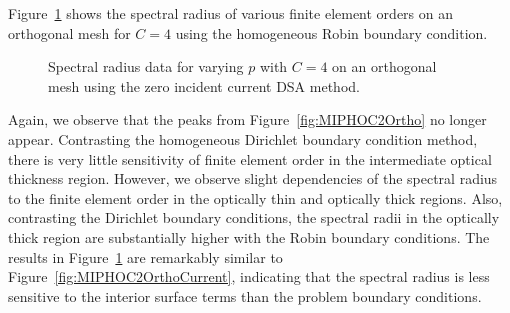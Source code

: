 \documentclass[12pt,letterpaper]{article}
\begin{document}
Figure~\ref{fig:MIPHOC4OrthoCurrent} shows the spectral radius of various finite element orders on an orthogonal mesh for $C=4$ using the homogeneous Robin boundary condition.
%
\begin{figure}[!hbt]
\centering
{}
\caption{Spectral radius data for varying $p$ with $C=4$ on an orthogonal mesh using the zero incident current DSA method.}
\label{fig:MIPHOC4OrthoCurrent}
\end{figure}
%
Again, we observe that the peaks from Figure~\ref{fig:MIPHOC2Ortho} no longer appear. Contrasting the homogeneous Dirichlet boundary condition method, there is very little sensitivity of finite element order in the intermediate optical thickness region. However, we observe slight dependencies of the spectral radius to the finite element order in the optically thin and optically thick regions. Also, contrasting the Dirichlet boundary conditions, the spectral radii in the optically thick region are substantially higher with the Robin boundary conditions. The results in Figure~\ref{fig:MIPHOC4OrthoCurrent} are remarkably similar to Figure~\ref{fig:MIPHOC2OrthoCurrent}, indicating that the spectral radius is less sensitive to the interior surface terms than the problem boundary conditions.
\end{document}
